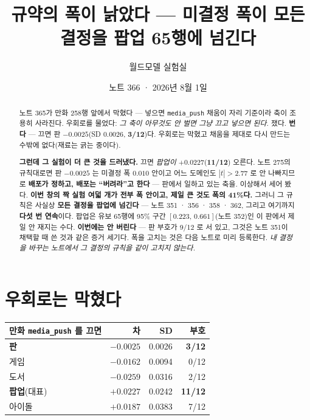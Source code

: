 \documentclass[11pt]{article}
\begin{document}
\title{규약의 폭이 낡았다 --- 미결정 폭이 모든 결정을 팝업 65행에 넘긴다}
\author{월드모델 실험실}
\date{노트 366 · 2026년 8월 1일}
\maketitle

\begin{abstract}
노트 365가 만화 258행 앞에서 막혔다 --- 넣으면 \texttt{media\_push} 채움이
자리 기준이라 축이 조용히 사라진다. 우회로를 물었다: \emph{그 축이 아무것도
안 벌면 그냥 끄고 넣으면 된다.} 쟀다. \textbf{번다} --- 끄면 판
$-0.0025$(SD 0.0026, \textbf{3/12})다. 우회로는 막혔고 채움을 제대로 다시
만드는 수밖에 없다(재료는 긁는 중이다).

\textbf{그런데 그 실험이 더 큰 것을 드러냈다.} 끄면 \emph{팝업이}
$+0.0227$(\textbf{11/12}) 오른다. 노트 275의 규칙대로면 판 $-0.0025$ 는
미결정 폭 $0.010$ 안이고 어느 도메인도 $|t|>2.77$ 로 안 나빠지므로
\textbf{배포가 정하고, 배포는 ``버려라''고 한다} --- 판에서 일하고 있는
축을. 이상해서 세어 봤다. \textbf{이번 창의 짝 실험 여덟 개가 전부 폭
안이고, 제일 큰 것도 폭의 41\%다.} 그러니 그 규칙은 사실상
\textbf{모든 결정을 팝업에 넘긴다} --- 노트 351 · 356 · 358 · 362, 그리고
여기까지 \textbf{다섯 번 연속}이다. 팝업은 유보 65행에 95\% 구간
$[0.223,\,0.661]$(노트 352)인 이 판에서 제일 안 재지는 수다.
\textbf{이번에는 안 버린다} --- 판 부호가 9/12 로 서 있고, 그것은 노트
351이 채택할 때 쓴 것과 같은 증거 세기다. 폭을 고치는 것은 다음 노트로
미리 등록한다. \emph{내 결정을 바꾸는 노트에서 그 결정의 규칙을 같이
고치지 않는다.}
\end{abstract}

\section{우회로는 막혔다}

\begin{center}
\begin{tabular}{lrrr}
\hline
만화 \texttt{media\_push} 를 끄면 & 차 & SD & 부호 \\
\hline
\textbf{판} & $-0.0025$ & 0.0026 & \textbf{3/12} \\
게임 & $-0.0162$ & 0.0094 & 0/12 \\
도서 & $-0.0259$ & 0.0316 & 2/12 \\
\textbf{팝업}(대표) & $\mathbf{+0.0227}$ & 0.0242 & \textbf{11/12} \\
아이돌 & $+0.0187$ & 0.0383 & 7/12 \\
\hline
\end{tabular}
\end{center}
\end{document}
